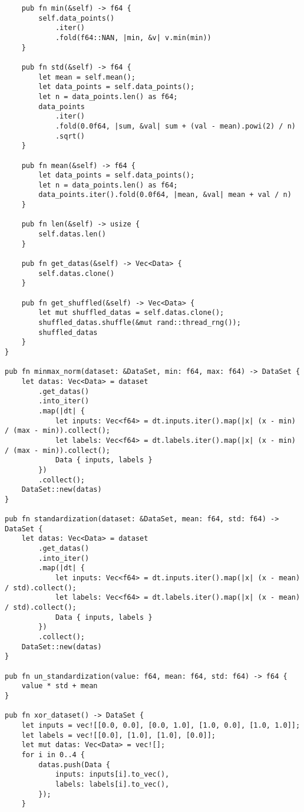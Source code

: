 \begin{verbatim}
    pub fn min(&self) -> f64 {
        self.data_points()
            .iter()
            .fold(f64::NAN, |min, &v| v.min(min))
    }

    pub fn std(&self) -> f64 {
        let mean = self.mean();
        let data_points = self.data_points();
        let n = data_points.len() as f64;
        data_points
            .iter()
            .fold(0.0f64, |sum, &val| sum + (val - mean).powi(2) / n)
            .sqrt()
    }

    pub fn mean(&self) -> f64 {
        let data_points = self.data_points();
        let n = data_points.len() as f64;
        data_points.iter().fold(0.0f64, |mean, &val| mean + val / n)
    }

    pub fn len(&self) -> usize {
        self.datas.len()
    }

    pub fn get_datas(&self) -> Vec<Data> {
        self.datas.clone()
    }

    pub fn get_shuffled(&self) -> Vec<Data> {
        let mut shuffled_datas = self.datas.clone();
        shuffled_datas.shuffle(&mut rand::thread_rng());
        shuffled_datas
    }
}

pub fn minmax_norm(dataset: &DataSet, min: f64, max: f64) -> DataSet {
    let datas: Vec<Data> = dataset
        .get_datas()
        .into_iter()
        .map(|dt| {
            let inputs: Vec<f64> = dt.inputs.iter().map(|x| (x - min) / (max - min)).collect();
            let labels: Vec<f64> = dt.labels.iter().map(|x| (x - min) / (max - min)).collect();
            Data { inputs, labels }
        })
        .collect();
    DataSet::new(datas)
}

pub fn standardization(dataset: &DataSet, mean: f64, std: f64) -> DataSet {
    let datas: Vec<Data> = dataset
        .get_datas()
        .into_iter()
        .map(|dt| {
            let inputs: Vec<f64> = dt.inputs.iter().map(|x| (x - mean) / std).collect();
            let labels: Vec<f64> = dt.labels.iter().map(|x| (x - mean) / std).collect();
            Data { inputs, labels }
        })
        .collect();
    DataSet::new(datas)
}

pub fn un_standardization(value: f64, mean: f64, std: f64) -> f64 {
    value * std + mean
}

pub fn xor_dataset() -> DataSet {
    let inputs = vec![[0.0, 0.0], [0.0, 1.0], [1.0, 0.0], [1.0, 1.0]];
    let labels = vec![[0.0], [1.0], [1.0], [0.0]];
    let mut datas: Vec<Data> = vec![];
    for i in 0..4 {
        datas.push(Data {
            inputs: inputs[i].to_vec(),
            labels: labels[i].to_vec(),
        });
    }


\end{verbatim}

